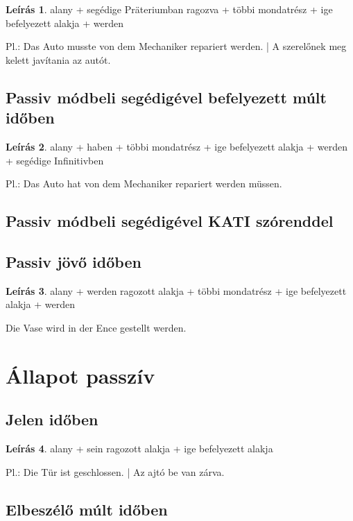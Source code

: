 \documentclass{article}
\theoremstyle{definition}
\newtheorem*{desc}{Leírás}
\begin{document}
\begin{desc}
alany + segédige Präteriumban ragozva + többi mondatrész + ige befelyezett alakja + werden

Pl.: Das Auto musste von dem Mechaniker repariert werden. | A szerelőnek meg kelett javítania az autót.
\end{desc}

\subsection{Passiv módbeli segédigével befelyezett múlt időben}

\begin{desc}
alany + haben + többi mondatrész + ige befelyezett alakja + werden + segédige Infinitivben

Pl.: Das Auto hat von dem Mechaniker repariert werden müssen.
\end{desc}

\subsection{Passiv módbeli segédigével KATI szórenddel}

\subsection{Passiv jövő időben}

\begin{desc}
alany + werden ragozott alakja + többi mondatrész + ige befelyezett alakja + werden

Die Vase wird in der Ence gestellt werden.
\end{desc}

\section{Állapot passzív}

\subsection{Jelen időben}

\begin{desc}
alany + sein ragozott alakja + ige befelyezett alakja

Pl.: Die Tür ist geschlossen. | Az ajtó be van zárva.
\end{desc}

\subsection{Elbeszélő múlt időben}
\end{document}
